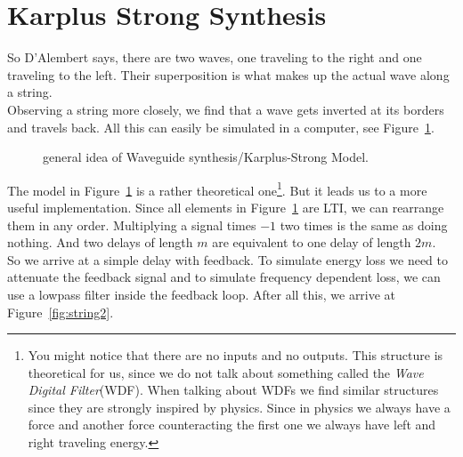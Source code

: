 \section{Karplus Strong Synthesis}
So D'Alembert says, there are two waves, one traveling to the right and one traveling to the left. Their superposition is what makes up the actual wave along a string. \\
Observing a string more closely, we find that a wave gets inverted at its borders and travels back.
All this can easily be simulated in a computer, see Figure~\ref{fig:string}.


  \begin{figure}[htb]
  \centering
  \label{fig:string}

  \caption{general idea of Waveguide synthesis/Karplus-Strong Model.}
\end{figure}

The model in Figure~\ref{fig:string} is a rather theoretical one\footnote{You might notice that there are no inputs and no outputs. This structure is theoretical for us, since we do not talk about something called the \textit{Wave Digital Filter}(WDF). When talking about WDFs we find similar structures since they are strongly inspired by physics. Since in physics we always have a force and another force counteracting the first one we always have left and right traveling energy.}. But it leads us to a more useful implementation. Since all elements in Figure~\ref{fig:string} are LTI, we can rearrange them in any order. Multiplying a signal times $-1$ two times is the same as doing nothing. And two delays of length $m$ are equivalent to one delay of length $2m$.\\
So we arrive at a simple delay with feedback. To simulate energy loss we need to attenuate the feedback signal and to simulate frequency dependent loss, we can use a lowpass filter inside the feedback loop. After all this, we arrive at Figure~\ref{fig:string2}.

